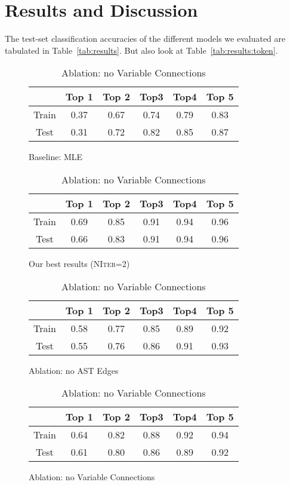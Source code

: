 \section{Results and Discussion}
\label{sec:results}


The test-set classification accuracies of the different models we evaluated are tabulated in Table~\ref{tab:results}. But also look at Table~\ref{tab:results:token}.


\begin{table}
  \centering
  \begin{subfigure}{\linewidth}
    \centering
    \begin{tabular}{c|ccccc}
      & Top 1 & Top 2 & Top3 & Top4 & Top 5 \\
      \hline
      Train & 0.37 & 0.67 & 0.74 & 0.79 & 0.83 \\
      Test & 0.31 & 0.72 & 0.82 & 0.85 & 0.87
    \end{tabular}
    \caption{Baseline: MLE}\label{tab:results:mle}
  \end{subfigure}

  \medskip

  \begin{subfigure}{\linewidth}
    \centering
    \begin{tabular}{c|ccccc}
      & Top 1 & Top 2 & Top3 & Top4 & Top 5 \\
      \hline
      Train & 0.69 & 0.85 & 0.91 & 0.94 & 0.96 \\
      Test & 0.66 & 0.83 & 0.91 & 0.94 & 0.96
    \end{tabular}
    \caption{Our best results (\textsc{NIter}=2)}\label{tab:results:pure}
  \end{subfigure}

  \medskip

  \begin{subfigure}{\linewidth}
    \centering
    \begin{tabular}{c|ccccc}
      & Top 1 & Top 2 & Top3 & Top4 & Top 5 \\
      \hline
      Train & 0.58 & 0.77 & 0.85 & 0.89 & 0.92 \\
      Test & 0.55 & 0.76 & 0.86 & 0.91 & 0.93
    \end{tabular}
    \caption{Ablation: no AST Edges}\label{tab:results:ast}
  \end{subfigure}

  \medskip

  \begin{subfigure}{\linewidth}
    \centering
    \begin{tabular}{c|ccccc}
      & Top 1 & Top 2 & Top3 & Top4 & Top 5 \\
      \hline
      Train & 0.64 & 0.82 & 0.88 & 0.92 & 0.94 \\
      Test & 0.61 & 0.80 & 0.86 & 0.89 & 0.92
    \end{tabular}
    \caption{Ablation: no Variable Connections}\label{tab:results:variable}
  \end{subfigure}


\end{table}
